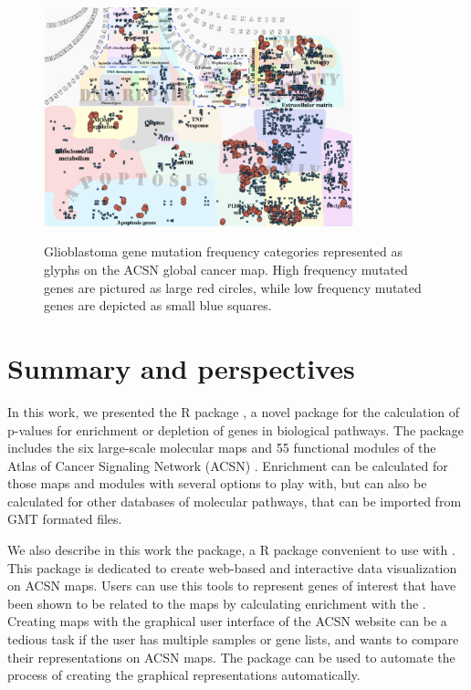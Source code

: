 \begin{figure}[!ht]
  \caption{Glioblastoma gene mutation frequency categories represented as
  glyphs on the ACSN global cancer map. High frequency mutated genes are
  pictured as large red circles, while low frequency mutated genes are depicted
  as small blue squares.
  } 
  \centering
  \includegraphics[width=0.8\textwidth]{figures/gbm.pdf}
  \label{fig:gbm}
\end{figure}

\section[Summary and perspectives]{Summary and perspectives}
In this work, we presented the R package , a novel package for
the calculation of p-values for enrichment or depletion of genes in biological
pathways. The package includes the six large-scale molecular maps and 55
functional modules of the Atlas of Cancer Signaling Network (ACSN) . Enrichment can be
calculated for those maps and modules with several options to play with, but can
also be calculated for other databases of molecular pathways, that can be
imported from GMT formated files. 

We also describe in this work the  package, a R package convenient to use with . This package is dedicated to create web-based
and interactive data visualization on ACSN maps. Users can use this tools to
represent genes of interest that have been shown to be related to the maps by
calculating enrichment with the  .  Creating maps with the
graphical user interface of the ACSN website can be a tedious task if the user
has multiple samples or gene lists, and wants to compare their representations
on ACSN maps. The  package can be used to automate the process of
creating the graphical representations automatically. 

